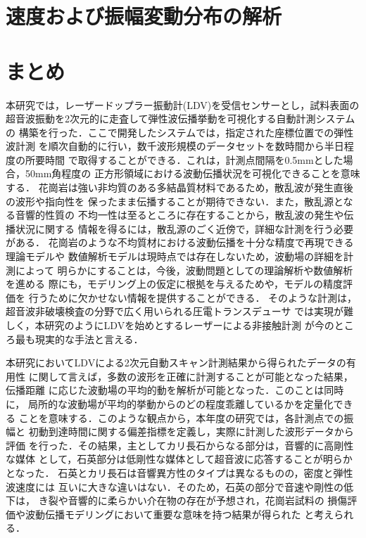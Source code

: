 ﻿\documentclass[11pt,a4j]{jarticle}
\begin{document}
\section{速度および振幅変動分布の解析}
%
\newpage
\section{まとめ}
本研究では，レーザードップラー振動計(LDV)を受信センサーとし，試料表面の
超音波振動を2次元的に走査して弾性波伝播挙動を可視化する自動計測システムの
構築を行った．ここで開発したシステムでは，指定された座標位置での弾性波計測
を順次自動的に行い，数千波形規模のデータセットを数時間から半日程度の所要時間
で取得することができる．これは，計測点間隔を0.5mmとした場合，50mm角程度の
正方形領域における波動伝播状況を可視化できることを意味する．
花崗岩は強い非均質のある多結晶質材料であるため，散乱波が発生直後の波形や指向性を
保ったまま伝播することが期待できない．また，散乱源となる音響的性質の
不均一性は至るところに存在することから，散乱波の発生や伝播状況に関する
情報を得るには，散乱源のごく近傍で，詳細な計測を行う必要がある．
花崗岩のような不均質材における波動伝播を十分な精度で再現できる理論モデルや
数値解析モデルは現時点では存在しないため，波動場の詳細を計測によって
明らかにすることは，今後，波動問題としての理論解析や数値解析を進める
際にも，モデリング上の仮定に根拠を与えるためや，モデルの精度評価を
行うために欠かせない情報を提供することができる．
そのような計測は，超音波非破壊検査の分野で広く用いられる圧電トランスデューサ
では実現が難しく，本研究のようにLDVを始めとするレーザーによる非接触計測
が今のところ最も現実的な手法と言える．

本研究においてLDVによる2次元自動スキャン計測結果から得られたデータの有用性
に関して言えば，多数の波形を正確に計測することが可能となった結果，伝播距離
に応じた波動場の平均的動を解析が可能となった．このことは同時に，
局所的な波動場が平均的挙動からのどの程度乖離しているかを定量化できる
ことを意味する．このような観点から，本年度の研究では，各計測点での振幅と
初動到達時間に関する偏差指標を定義し，実際に計測した波形データから評価
を行った．その結果，主としてカリ長石からなる部分は，音響的に高剛性な媒体
として，石英部分は低剛性な媒体として超音波に応答することが明らかとなった．
石英とカリ長石は音響異方性のタイプは異なるものの，密度と弾性波速度には
互いに大きな違いはない．そのため，石英の部分で音速や剛性の低下は，
き裂や音響的に柔らかい介在物の存在が予想され，花崗岩試料の
損傷評価や波動伝播モデリングにおいて重要な意味を持つ結果が得られた
と考えられる．
\end{document}

